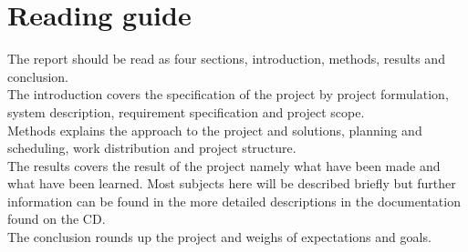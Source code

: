 \section{Reading guide}
The report should be read as four sections, introduction, methods, results and conclusion.\\
The introduction covers the specification of the project by project formulation, system description, requirement specification and project scope.\\
Methods explains the approach to the project and solutions, planning and scheduling, work distribution and project structure.\\
The results covers the result of the project namely what have been made and what have been learned. Most subjects here will be described briefly but further information can be found in the more detailed descriptions in the documentation found on the CD.\\
The conclusion rounds up the project and weighs of expectations and goals.


